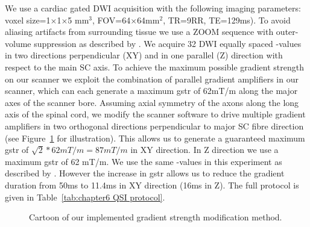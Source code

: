 We use a cardiac gated \gls{DWI} acquisition with the following imaging parameters: voxel size=1$\times$1$\times$5 mm$^3$, FOV=64$\times$64mm$^2$, TR=9RR, TE=129ms). To avoid aliasing artifacts from surrounding tissue we use a ZOOM sequence with outer-volume suppression as described by \citet{Wilm:2007}. We acquire 32 \gls{DWI} equally spaced {\q}-values in two directions perpendicular (XY) and in one parallel (Z) direction with respect to the main {\gls{SC}} axis. To achieve the maximum possible gradient strength on our scanner we exploit the combination of parallel gradient amplifiers in our scanner, which can each generate a maximum \gls{gstr} of 62mT/m along the major axes of the scanner bore. Assuming axial symmetry of the axons along the long axis of the spinal cord, we modify the scanner software to drive multiple gradient amplifiers in two orthogonal directions perpendicular to major SC fibre direction (see Figure~\ref{fig:chapter5_exp2_overplus_cartoon} for illustration). This allows us to generate a guaranteed maximum \gls{gstr} of $\sqrt{2} * 62mT/m = 87mT/m$ in XY direction.  In Z direction we use a maximum \gls{gstr} of 62 mT/m. We use the same {\q}-values in this experiment as described by \citet{Farrell:2008}. However the increase in \gls{gstr} allows us to reduce the gradient duration from 50ms to 11.4ms in XY direction (16ms in Z). The full protocol is given in Table~\ref{tab:chapter6 QSI protocol}.

\begin{figure}
  \caption{Cartoon of our implemented gradient strength modification method.}
  \label{fig:chapter5_exp2_overplus_cartoon}
\end{figure}

